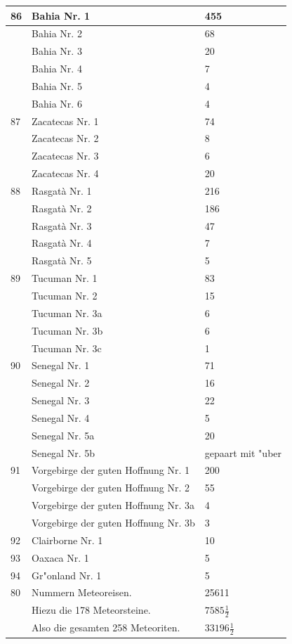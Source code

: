 \documentclass[a4paper, 11pt, oneside, polutonikogreek, german]{article}
\begin{document}
\begin{center}
\begin{longtable}{|l|l|l|}
        86 & Bahia Nr. 1 & 455 \\ \hline
          & Bahia Nr. 2 & 68 \\ \hline
          & Bahia Nr. 3 & 20 \\ \hline
          & Bahia Nr. 4 & 7 \\ \hline
          & Bahia Nr. 5 & 4 \\ \hline
          & Bahia Nr. 6 & 4 \\ \hline
        87 & Zacatecas Nr. 1 & 74 \\ \hline
          & Zacatecas Nr. 2 & 8 \\ \hline
          & Zacatecas Nr. 3 & 6 \\ \hline
          & Zacatecas Nr. 4 & 20 \\ \hline
        88 & Rasgatà Nr. 1 & 216 \\ \hline
          & Rasgatà Nr. 2 & 186 \\ \hline
          & Rasgatà Nr. 3 & 47 \\ \hline
          & Rasgatà Nr. 4 & 7 \\ \hline
          & Rasgatà Nr. 5 & 5 \\ \hline
        89 & Tucuman Nr. 1 & 83 \\ \hline
          & Tucuman Nr. 2 & 15 \\ \hline
          & Tucuman Nr. 3a & 6 \\ \hline
          & Tucuman Nr. 3b & 6 \\ \hline
          & Tucuman Nr. 3c & 1 \\ \hline
        90 & Senegal Nr. 1 & 71 \\ \hline
          & Senegal Nr. 2 & 16 \\ \hline
          & Senegal Nr. 3 & 22 \\ \hline
          & Senegal Nr. 4 & 5 \\ \hline
          & Senegal Nr. 5a & 20 \\ \hline
          & Senegal Nr. 5b & gepaart mit "uber \\ \hline
        91 & Vorgebirge der guten Hoffnung Nr. 1 & 200 \\ \hline
          & Vorgebirge der guten Hoffnung Nr. 2 & 55 \\ \hline
          & Vorgebirge der guten Hoffnung Nr. 3a & 4 \\ \hline
          & Vorgebirge der guten Hoffnung Nr. 3b & 3 \\ \hline
        92 & Clairborne Nr. 1 & 10 \\ \hline
        93 & Oaxaca Nr. 1 & 5 \\ \hline
        94 & Gr"onland Nr. 1 & 5 \\ \hline
        80 & Nummern Meteoreisen. & 25611 \\ \hline
          & Hiezu die 178 Meteorsteine. & $\mathfrak{7585\frac{1}{2}}$ \\ \hline
          & Also die gesamten 258 Meteoriten. & $\mathfrak{33196\frac{1}{2}}$ \\ \hline
    \end{longtable}
\end{center}
\clearpage
\end{document}

